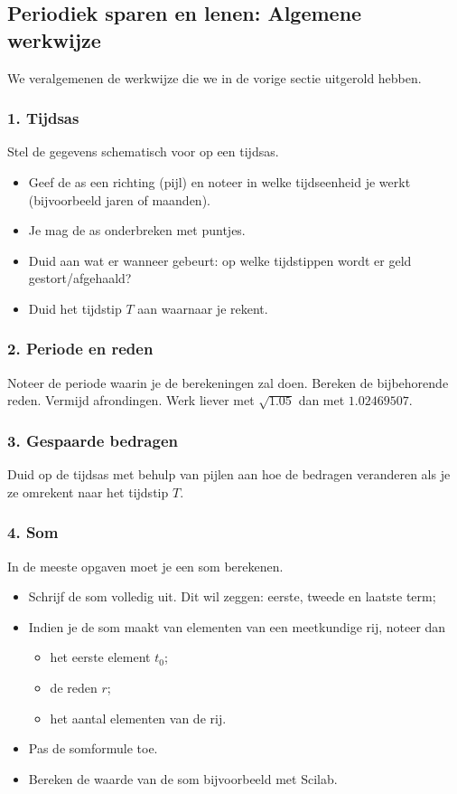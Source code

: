 \subsection{Periodiek sparen en lenen: Algemene werkwijze}

We veralgemenen de werkwijze die we in de vorige sectie uitgerold hebben. 

\subsubsection{1. Tijdsas}
Stel de gegevens schematisch voor op een tijdsas.
\begin{itemize}
\item Geef de as een richting (pijl) en noteer in welke tijdseenheid je
werkt (bijvoorbeeld jaren of maanden).
\item Je mag de as onderbreken met puntjes.
\item Duid aan wat er wanneer gebeurt: op welke tijdstippen wordt er geld
gestort/afgehaald? 	
\item Duid het tijdstip $T$ aan waarnaar je rekent.
\end{itemize}

\subsubsection{2.	Periode en reden}
Noteer de periode waarin je de berekeningen zal doen. Bereken de bijbehorende reden. Vermijd afrondingen. Werk liever met $\sqrt{\num{1.05}}$ dan met $\num{1.02469507}$.

\subsubsection{3.	Gespaarde bedragen}
Duid op de tijdsas met behulp van pijlen aan hoe de bedragen veranderen als je ze omrekent naar het tijdstip $T$.

\subsubsection{4. Som}
In de meeste opgaven moet je een som berekenen.
\begin{itemize}
\item Schrijf de som volledig uit.  Dit wil zeggen: eerste, tweede en laatste
term;
\item 	Indien je de som maakt van elementen van een meetkundige rij,
noteer dan
\begin{itemize}
\item het eerste element $t_0$; 
\item de reden $r$; 
\item het aantal elementen van de rij.
\end{itemize}
\item 	Pas de somformule toe. 	
\item Bereken de waarde van de som bijvoorbeeld met Scilab.
\end{itemize}

